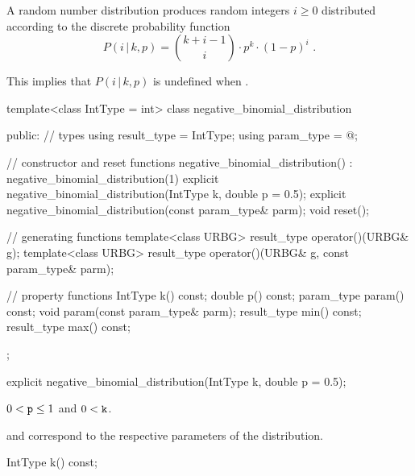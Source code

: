 \pnum
A  random number distribution
produces random integers $i \geq 0$
distributed according to
the discrete probability function
%
%
\[ P(i\,|\,k,p) = \binom{k+i-1}{i} \cdot p^k \cdot (1-p)^i \text{ .} \]
\begin{note}
This implies that $P(i\,|\,k,p)$ is undefined when .
\end{note}

%
%
\begin{codeblock}
template<class IntType = int>
  class negative_binomial_distribution {
  public:
    // types
    using result_type = IntType;
    using param_type  = @\unspec@;

    // constructor and reset functions
    negative_binomial_distribution() : negative_binomial_distribution(1) {}
    explicit negative_binomial_distribution(IntType k, double p = 0.5);
    explicit negative_binomial_distribution(const param_type& parm);
    void reset();

    // generating functions
    template<class URBG>
      result_type operator()(URBG& g);
    template<class URBG>
      result_type operator()(URBG& g, const param_type& parm);

    // property functions
    IntType k() const;
    double p() const;
    param_type param() const;
    void param(const param_type& parm);
    result_type min() const;
    result_type max() const;
  };
\end{codeblock}


%
\begin{itemdecl}
explicit negative_binomial_distribution(IntType k, double p = 0.5);
\end{itemdecl}

\begin{itemdescr}
\pnum
\expects
$0 < \texttt{p} \leq 1$
and $0 < \texttt{k} $.

\pnum
\remarks
  and 
 correspond to the respective parameters of the distribution.
\end{itemdescr}

%
\begin{itemdecl}
IntType k() const;
\end{itemdecl}

